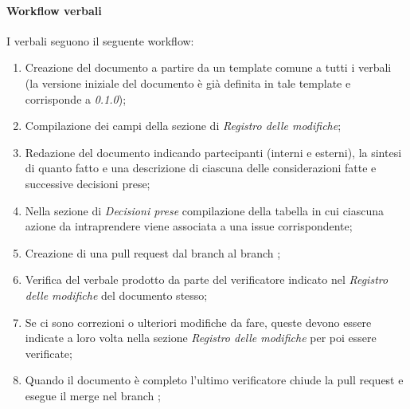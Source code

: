     \paragraph{Workflow verbali}
    I verbali seguono il seguente workflow:
    \begin{enumerate}
        \item Creazione del documento a partire da un template comune
        a tutti i verbali (la versione iniziale del documento è già 
        definita in tale template e corrisponde a \textit{0.1.0});
        \item Compilazione dei campi della sezione di \textit{Registro 
        delle modifiche};
        \item Redazione del documento indicando partecipanti (interni e 
        esterni), la sintesi di quanto fatto e una descrizione di ciascuna 
        delle considerazioni fatte e successive decisioni prese;
        \item Nella sezione di \textit{Decisioni prese} compilazione della 
        tabella in cui ciascuna azione da intraprendere viene associata 
        a una issue corrispondente;
        \item Creazione di una pull request dal branch 
        al branch ;
        \item Verifica del verbale prodotto da parte del verificatore 
        indicato nel \textit{Registro delle modifiche} del documento stesso;
        \item Se ci sono correzioni o ulteriori modifiche da fare, queste 
        devono essere indicate a loro volta nella sezione 
        \textit{Registro delle modifiche} per poi essere verificate;
        \item Quando il documento è completo l'ultimo verificatore 
        chiude la pull request e esegue il merge nel branch ;
    \end{enumerate}

